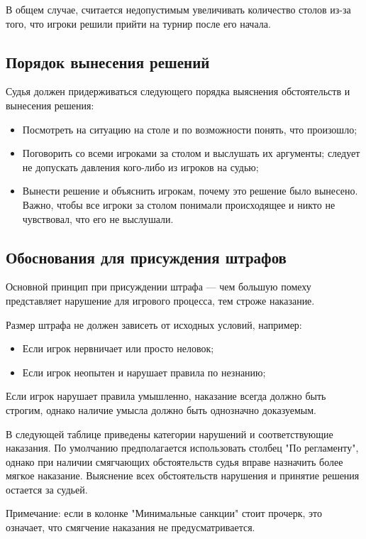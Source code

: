 В общем случае, считается недопустимым увеличивать количество столов из-за того, что игроки решили прийти на турнир после его начала.

\subsection{Порядок вынесения решений}

Судья должен придерживаться следующего порядка выяснения обстоятельств и вынесения решения:
\begin{itemize}
	\item Посмотреть на ситуацию на столе и по возможности понять, что произошло;
	\item Поговорить со всеми игроками за столом и выслушать их аргументы; следует не допускать давления кого-либо из игроков на судью;
	\item Вынести решение и объяснить игрокам, почему это решение было вынесено. Важно, чтобы все игроки за столом понимали происходящее и никто не чувствовал, что его не выслушали.
\end{itemize}

\subsection{Обоснования для присуждения штрафов}

Основной принцип при присуждении штрафа --- чем большую помеху представляет нарушение для игрового процесса, тем строже наказание.

Размер штрафа не должен зависеть от исходных условий, например:
\begin{itemize}
	\item Если игрок нервничает или просто неловок;
	\item Если игрок неопытен и нарушает правила по незнанию;
\end{itemize}

Если игрок нарушает правила умышленно, наказание всегда должно быть строгим, однако наличие умысла должно быть однозначно доказуемым.

В следующей таблице приведены категории нарушений и соответствующие наказания. По умолчанию предполагается использовать столбец "По регламенту", однако при наличии смягчающих обстоятельств судья вправе назначить более мягкое наказание. Выяснение всех обстоятельств нарушения и принятие решения остается за судьей. 

Примечание: если в колонке "Минимальные санкции" стоит прочерк, это означает, что смягчение наказания не предусматривается.

